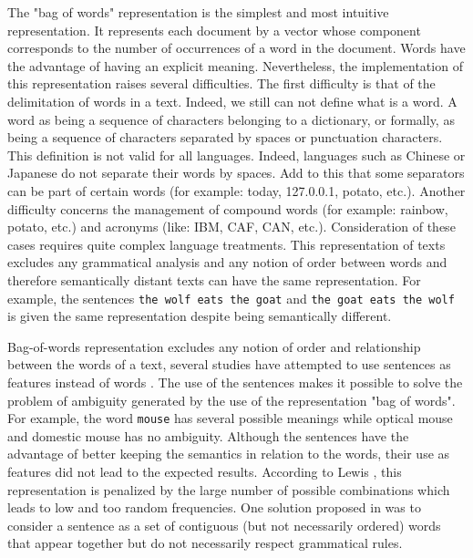 The "bag of words" representation is the simplest and most intuitive
representation. It represents each document by a vector
whose component corresponds to the number of occurrences of a word in
the document.  Words have the advantage of having an
explicit meaning. Nevertheless, the implementation of this
representation raises several difficulties. The first difficulty is that
of the delimitation of words in a text. Indeed, we still can not define
what is a word. A word as being a sequence of
characters belonging to a dictionary, or formally, as being a sequence
of characters separated by spaces or punctuation characters. This
definition is not valid for all languages. Indeed, languages such as
Chinese or Japanese do not separate their words by spaces. Add to this
that some separators can be part of certain words (for example: today,
127.0.0.1, potato, etc.). Another difficulty concerns the management of
compound words (for example: rainbow, potato, etc.) and acronyms (like:
IBM, CAF, CAN, etc.). Consideration of these cases requires quite
complex language treatments. This representation of texts excludes any
grammatical analysis and any notion of order between words and therefore
semantically distant texts can have the same representation. For
example, the sentences \texttt{the\ wolf\ eats\ the\ goat} and
\texttt{the\ goat\ eats\ the\ wolf} is given the same representation
despite being semantically different.


Bag-of-words representation excludes any notion of order and
relationship between the words of a text, several studies have
attempted to use sentences as features instead of words \citep{fuhr1991probabilistic} \citep{tzeras1993automatic}.
The use of the sentences makes it possible to solve the problem of
ambiguity generated by the use of the representation "bag of words". For
example, the word \texttt{mouse} has several possible meanings while
optical mouse and domestic mouse has no ambiguity. Although the
sentences have the advantage of better keeping the semantics in relation
to the words, their use as features did not lead to the expected
results. According to Lewis \citep{lewis1992representation}, this representation is penalized
by the large number of possible combinations which leads to low and too
random frequencies. One solution proposed in \citep{caropreso2001learner} was to consider a
sentence as a set of contiguous (but not necessarily ordered) words that
appear together but do not necessarily respect grammatical rules.

